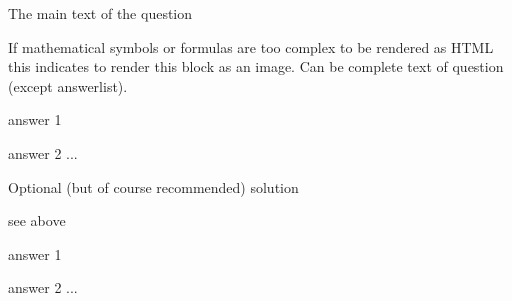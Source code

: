 
\begin{question}           %

  The main text of the question

  \begin{image}            %
    If mathematical symbols or formulas are too complex to be rendered
    as HTML this indicates to render this block as an image. Can be
    complete text of question (except answerlist).
  \end{image}

  \begin{answerlist}       %
   \item answer 1
   \item answer 2
    ...
  \end{answerlist}

\end{question}

\begin{solution}           %

  Optional (but of course recommended) solution

  \begin{image}            %
    see above
  \end{image}

  \begin{answerlist}       %
   \item answer 1
   \item answer 2
    ...
  \end{answerlist}
  
\end{solution}




